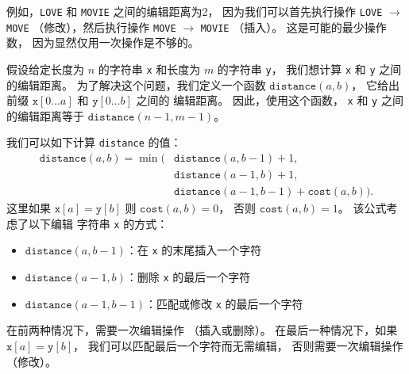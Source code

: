 例如，\texttt{LOVE} 和 \texttt{MOVIE} 之间的编辑距离为2，
因为我们可以首先执行操作
 \texttt{LOVE} $\rightarrow$ \texttt{MOVE}
（修改），然后执行操作
\texttt{MOVE} $\rightarrow$ \texttt{MOVIE}
（插入）。
这是可能的最少操作数，
因为显然仅用一次操作是不够的。

假设给定长度为 $n$ 的字符串 \texttt{x}
和长度为 $m$ 的字符串 \texttt{y}，
我们想计算
\texttt{x} 和 \texttt{y} 之间的编辑距离。
为了解决这个问题，我们定义一个函数
$\texttt{distance}(a,b)$，
它给出前缀
$\texttt{x}[0 \ldots a]$ 和 $\texttt{y}[0 \ldots b]$ 之间的
编辑距离。
因此，使用这个函数，
\texttt{x} 和 \texttt{y} 之间的编辑距离等于 $\texttt{distance}(n-1,m-1)$。

我们可以如下计算 \texttt{distance} 的值：
\begin{equation*}
\begin{split}
\texttt{distance}(a,b) = \min(& \texttt{distance}(a,b-1)+1, \\
                           & \texttt{distance}(a-1,b)+1, \\
                           & \texttt{distance}(a-1,b-1)+\texttt{cost}(a,b)).
\end{split}
\end{equation*}
这里如果 $\texttt{x}[a]=\texttt{y}[b]$ 则 $\texttt{cost}(a,b)=0$，
否则 $\texttt{cost}(a,b)=1$。
该公式考虑了以下编辑
字符串 \texttt{x} 的方式：
\begin{itemize}
\item $\texttt{distance}(a,b-1)$：在 \texttt{x} 的末尾插入一个字符
\item $\texttt{distance}(a-1,b)$：删除 \texttt{x} 的最后一个字符
\item $\texttt{distance}(a-1,b-1)$：匹配或修改 \texttt{x} 的最后一个字符
\end{itemize}
在前两种情况下，需要一次编辑操作
（插入或删除）。
在最后一种情况下，如果 $\texttt{x}[a]=\texttt{y}[b]$，
我们可以匹配最后一个字符而无需编辑，
否则需要一次编辑操作（修改）。

